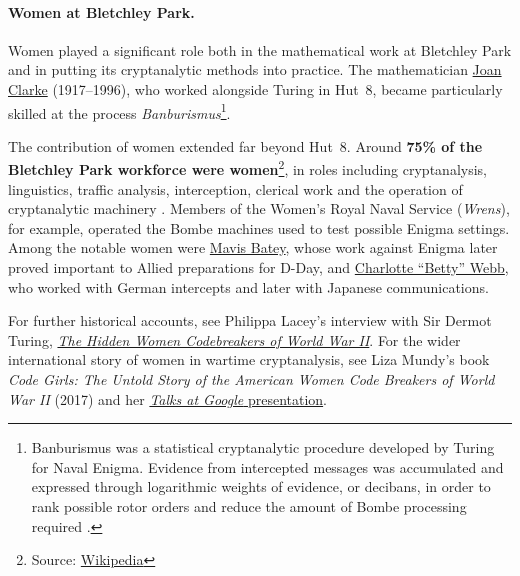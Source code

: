 \paragraph{Women at Bletchley Park.}

Women played a significant role both in the mathematical work at Bletchley
Park and in putting its cryptanalytic methods into practice. The mathematician
\href{https://www.gchq.gov.uk/information/joan-clarke}{Joan Clarke} (1917--1996), who worked alongside Turing in Hut~8, became particularly
skilled at the process  \emph{Banburismus}\footnote{Banburismus was a statistical cryptanalytic procedure developed by Turing for Naval Enigma. Evidence from intercepted messages was accumulated and expressed through logarithmic weights of evidence, or decibans, in order to rank possible rotor orders and reduce the amount of Bombe processing required \cite{good1979turing,zabell2012turing}.}. 

The contribution of women extended far beyond Hut~8. Around \textbf{75\% of the Bletchley Park workforce were women}\footnote{Source: \href{https://www.google.com/search?q=how+many+women+worked+in+blenchley+park&oq=how+many+women+worked+in+blenchley+park&gs_lcrp=EgZjaHJvbWUyBggAEEUYOTIICAEQABgWGB4yDQgCEAAYhgMYgAQYigUyDQgDEAAYhgMYgAQYigUyDQgEEAAYhgMYgAQYigUyDQgFEAAYhgMYgAQYigUyDQgGEAAYhgMYgAQYigXSAQg4Njg0ajBqN6gCALACAA&sourceid=chrome&source=chrome.ob&ie=UTF-8}{Wikipedia}}, in roles including cryptanalysis, linguistics, traffic analysis, interception, clerical work and the operation of cryptanalytic machinery  \cite{gchq2017women}. Members of the Women's Royal Naval Service (\emph{Wrens}), for example, operated the Bombe machines used to test possible
Enigma settings. Among the notable women were
\href{https://www.gchq.gov.uk/section/history/people-from-our-past} {Mavis Batey}, whose work against Enigma later proved important to Allied preparations for D-Day, and \href{https://www.bletchleypark.org.uk/betty_webb/}
{Charlotte ``Betty'' Webb}, who worked with German intercepts and later with Japanese communications.

For further historical accounts, see Philippa Lacey's interview with Sir Dermot Turing,  \href{https://youtu.be/eCP7ZIGcomk?si=ks0lL17KtvcQlQ5c} {\textit{The Hidden Women Codebreakers of World War II}}. For the wider
international story of women in wartime cryptanalysis, see Liza Mundy's book
\textit{Code Girls: The Untold Story of the American Women Code Breakers of
World War II} (2017) and her
\href{https://youtu.be/D9sYm32TR8A?si=wstiQGtGWrX9U_mw} 
{\textit{Talks at Google} presentation}.



